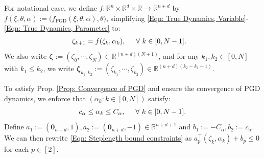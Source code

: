 \documentclass[letterpaper, 10 pt, conference]{ieeeconf}
\newcommand{\ra}{\rightarrow}
\newcommand{\R}{\mathbb{R}}
\newcommand{\?}{\stackrel{?}{=}}
\newcommand{\param}{\theta}
\newcommand{\paramDim}{d}
\newcommand{\var}{\xi}
\newcommand{\varDim}{n}
\newcommand{\varStacked}{\boldsymbol{\var}}
\newcommand{\paramStacked}{\boldsymbol{\param}}
\newcommand{\smoothnessConstant}{L}
\newcommand{\ratePGD}{\alpha}
\newcommand{\ratePGDMin}{c_\ratePGD}
\newcommand{\ratePGDMax}{C_\ratePGD}
\newcommand{\dynamicsPGD}{f_{\text{PGD}}}
\newcommand{\iterationHorizon}{N}
\newcommand{\state}{\zeta}
\newcommand{\stateStacked}{\boldsymbol{\state}}
\newcommand{\dynamicsFullState}{f}
\newcommand{\zero}{\textbf{0}}
\newcommand{\ratePGDBoundSlope}{a}
\newcommand{\ratePGDBoundOffset}{b}
\newcommand{\inequalityConstraints}{g}
\newcommand{\antoine}[1]{{\textcolor[rgb]{1,0,0}{\textsf{[Antoine: {#1}]}}}}
\begin{document}
For notational ease, we define $\dynamicsFullState: \R^{\varDim} \times \R^\paramDim \times \R \ra \R^{\varDim + \paramDim}$ by 
$\dynamicsFullState(\var, \param, \ratePGD) := \big(\dynamicsPGD(\var, \param, \ratePGD), \param \big)$, simplifying \eqref{Eqn: True Dynamics, Variable}-\eqref{Eqn: True Dynamics, Parameter} to:
\begin{align}
    \label{Eqn: True Dynamics, Full State}
    \state_{k+1} &= \dynamicsFullState(\state_k, \ratePGD_k), \hspace{5mm} \forall \ k \in [0, \iterationHorizon - 1].
\end{align}
We also write $\stateStacked := (\state_0, \cdots, \state_\iterationHorizon) \in \R^{(\varDim + \paramDim)(\iterationHorizon + 1)}$, and for any $k_1, k_2 \in [0, \iterationHorizon]$ with $k_1 \leq k_2$, we write $\stateStacked_{k_1:k_2} := (\state_{k_1}, \cdots, \state_{k_2}) \in \R^{(\varDim + \paramDim)(k_2 - k_1 + 1)}$.

To satisfy Prop. \ref{Prop: Convergence of PGD} and ensure the convergence of PGD dynamics, we enforce that 
$(\ratePGD_k: k \in [0, \iterationHorizon])$ satisfy:
\begin{align} 
\label{Eqn: Steplength bound constraints}
    \ratePGDMin \leq \ratePGD_k \leq \ratePGDMax, \hspace{5mm} \forall \ k \in [0, \iterationHorizon-1].
\end{align}
Define $\ratePGDBoundSlope_1 := (\zero_{\varDim + \paramDim}, 1), \ratePGDBoundSlope_2 := (\zero_{\varDim + \paramDim}, -1) \in \R^{\varDim + \paramDim + 1}$ and $\ratePGDBoundOffset_1 := - \ratePGDMax, \ratePGDBoundOffset_2 := \ratePGDMin$. 
We can then rewrite \eqref{Eqn: Steplength bound constraints} as $\ratePGDBoundSlope_p^\top (\state_k, \ratePGD_k) + \ratePGDBoundOffset_p \leq 0$ for each $p \in [2]$.
\end{document}
